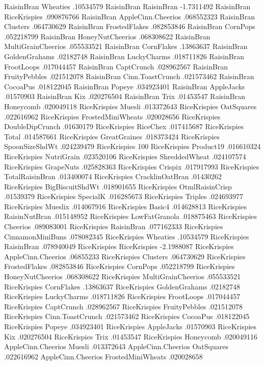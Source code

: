 RaisinBran	Wheaties	.10534579
RaisinBran	RaisinBran	-1.7311492
RaisinBran	RiceKrispies	.090876766
RaisinBran	AppleCinn.Cheerios	.068552323
RaisinBran	Clusters	.064730629
RaisinBran	FrostedFlakes	.082853846
RaisinBran	CornPops	.052218799
RaisinBran	HoneyNutCheerios	.068308622
RaisinBran	MultiGrainCheerios	.055533521
RaisinBran	CornFlakes	.13863637
RaisinBran	GoldenGrahams	.02182748
RaisinBran	LuckyCharms	.018711826
RaisinBran	FrootLoops	.017044457
RaisinBran	CaptCrunch	.028962567
RaisinBran	FruityPebbles	.021512078
RaisinBran	Cinn.ToastCrunch	.021573462
RaisinBran	CocoaPus	.018122045
RaisinBran	Popeye	.034923401
RaisinBran	AppleJacks	.01570903
RaisinBran	Kix	.020276504
RaisinBran	Trix	.01453547
RaisinBran	Honeycomb	.020049118
RiceKrispies	Muesli	.013372643
RiceKrispies	OatSquares	.022616962
RiceKrispies	FrostedMiniWheats	.020028656
RiceKrispies	DoubleDipCrunch	.01630179
RiceKrispies	RiceChex	.017415687
RiceKrispies	Total	.014587661
RiceKrispies	GreatGraines	.018373424
RiceKrispies	SpoonSizeShdWt	.024239479
RiceKrispies	100%
RiceKrispies	Product19	.016610324
RiceKrispies	NutriGrain	.023520106
RiceKrispies	ShreddedWheat	.024107574
RiceKrispies	GrapeNuts	.025828363
RiceKrispies	Crispix	.017917993
RiceKrispies	TotalRaisinBran	.013400074
RiceKrispies	CracklinOatBran	.01430262
RiceKrispies	BigBiscuitShdWt	.018901655
RiceKrispies	OtmlRaisinCrisp	.01539379
RiceKrispies	SpecialK	.016285673
RiceKrispies	Triples	.024693977
RiceKrispies	Mueslix	.014067916
RiceKrispies	Basic4	.014628813
RiceKrispies	RaisinNutBran	.015148952
RiceKrispies	LowFatGranola	.018875463
RiceKrispies	Cheerios	.089083001
RiceKrispies	RaisinBran	.077162333
RiceKrispies	CinnamonMiniBuns	.078082345
RiceKrispies	Wheaties	.10534579
RiceKrispies	RaisinBran	.078940049
RiceKrispies	RiceKrispies	-2.1988087
RiceKrispies	AppleCinn.Cheerios	.06855233
RiceKrispies	Clusters	.064730629
RiceKrispies	FrostedFlakes	.082853846
RiceKrispies	CornPops	.052218799
RiceKrispies	HoneyNutCheerios	.068308622
RiceKrispies	MultiGrainCheerios	.055533521
RiceKrispies	CornFlakes	.13863637
RiceKrispies	GoldenGrahams	.02182748
RiceKrispies	LuckyCharms	.018711826
RiceKrispies	FrootLoops	.017044457
RiceKrispies	CaptCrunch	.028962567
RiceKrispies	FruityPebbles	.021512078
RiceKrispies	Cinn.ToastCrunch	.021573462
RiceKrispies	CocoaPus	.018122045
RiceKrispies	Popeye	.034923401
RiceKrispies	AppleJacks	.01570903
RiceKrispies	Kix	.020276504
RiceKrispies	Trix	.01453547
RiceKrispies	Honeycomb	.020049116
AppleCinn.Cheerios	Muesli	.013372643
AppleCinn.Cheerios	OatSquares	.022616962
AppleCinn.Cheerios	FrostedMiniWheats	.020028658
